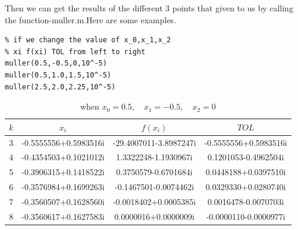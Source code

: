 \documentclass{article}
\begin{document}
Then we can get the results of the different 3 points that given to us by calling the function-muller.m.Here are some examples.

\begin{lstlisting}
% if we change the value of x_0,x_1,x_2
% xi f(xi) TOL from left to right
muller(0.5,-0.5,0,10^-5)
muller(0.5,1.0,1.5,10^-5)
muller(2.5,2.0,2.25,10^-5)
\end{lstlisting}

\begin{table}[h!]
\begin{center}
\caption{when $x_0 = 0.5 ,\quad x_1 = -0.5 ,\quad x_2 = 0$}
 \begin{tabular}{c c c c} 
 \hline
 \hline
$k$ & $x_i$ & $f(x_i)$ & $TOL$\\ \hline
3 & -0.5555556+0.5983516i &-29.4007011-3.8987247i &-0.5555556+0.5983516i\\ 
4 & -0.4354503+0.1021012i &1.3322248-1.1930967i &0.1201053-0.4962504i\\ 
5 & -0.3906315+0.1418522i &0.3750579-0.6701684i &0.0448188+0.0397510i\\ 
6 & -0.3576984+0.1699263i &-0.1467501-0.0074462i &0.0329330+0.0280740i\\ 
7 & -0.3560507+0.1628560i &-0.0018402+0.0005385i &0.0016478-0.0070703i\\ 
8 & -0.3560617+0.1627583i &0.0000016+0.0000009i &-0.0000110-0.0000977i\\ 
\hline
\hline
\end{tabular}
\end{center}
\end{table}

\end{document}
